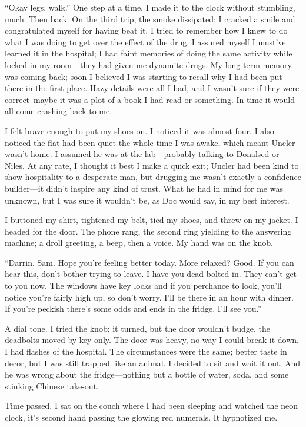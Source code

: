 \documentclass[
]{article}
\begin{document}
``Okay legs, walk.'' One step at a time. I made it to the clock without
stumbling, much. Then back. On the third trip, the smoke dissipated; I
cracked a smile and congratulated myself for having beat it. I tried to
remember how I knew to do what I was doing to get over the effect of the
drug. I assured myself I must've learned it in the hospital; I had faint
memories of doing the same activity while locked in my room---they had
given me dynamite drugs. My long-term memory was coming back; soon I
believed I was starting to recall why I had been put there in the first
place. Hazy details were all I had, and I wasn't sure if they were
correct--maybe it was a plot of a book I had read or something. In time
it would all come crashing back to me.

I felt brave enough to put my shoes on. I noticed it was almost four. I
also noticed the flat had been quiet the whole time I was awake, which
meant Uncler wasn't home. I assumed he was at the lab---probably talking
to Donalsed or Niles. At any rate, I thought it best I make a quick
exit; Uncler had been kind to show hospitality to a desperate man, but
drugging me wasn't exactly a confidence builder---it didn't inspire any
kind of trust. What he had in mind for me was unknown, but I was sure it
wouldn't be, as Doc would say, in my best interest.

I buttoned my shirt, tightened my belt, tied my shoes, and threw on my
jacket. I headed for the door. The phone rang, the second ring yielding
to the answering machine; a droll greeting, a beep, then a voice. My
hand was on the knob.

``Darrin. Sam. Hope you're feeling better today. More relaxed? Good. If
you can hear this, don't bother trying to leave. I have you dead-bolted
in. They can't get to you now. The windows have key locks and if you
perchance to look, you'll notice you're fairly high up, so don't worry.
I'll be there in an hour with dinner. If you're peckish there's some
odds and ends in the fridge. I'll see you.''

A dial tone. I tried the knob; it turned, but the door wouldn't budge,
the deadbolts moved by key only. The door was heavy, no way I could
break it down. I had flashes of the hospital. The circumstances were the
same; better taste in decor, but I was still trapped like an animal. I
decided to sit and wait it out. And he was wrong about the
fridge---nothing but a bottle of water, soda, and some stinking Chinese
take-out.

Time passed. I sat on the couch where I had been sleeping and watched
the neon clock, it's second hand passing the glowing red numerals. It
hypnotized me.
\end{document}
